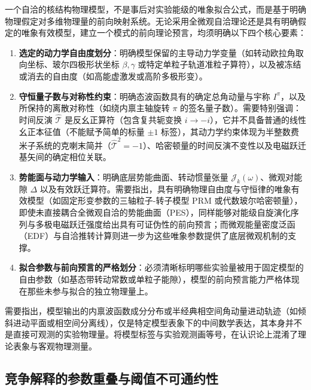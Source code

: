 一个自洽的核结构物理模型，不是事后对实验能级的唯象拟合公式，而是基于明确物理假定对多维物理量的前向映射系统。无论采用全微观自洽理论还是具有明确假定的唯象有效模型，建立一个模式的前向理论预言，均须明确以下四个核心要素：
\begin{enumerate}
\item \textbf{选定的动力学自由度划分}：明确模型保留的主导动力学变量（如转动欧拉角取向坐标、玻尔四极形状坐标 $\beta, \gamma$ 或特定单粒子轨道准粒子算符），以及被冻结或消去的自由度（如高能虚激发或高阶多极形变）。
\item \textbf{守恒量子数与对称性约束}：明确态波函数具有的确定总角动量与宇称 $I^\pi$，以及所保持的离散对称性（如绕内禀主轴旋转 $\pi$ 的签名量子数）。需要特别强调：时间反演 $\hat{\mathcal{T}}$ 是反幺正算符（包含复共轭变换 $i \to -i$），它并不具备普通的线性幺正本征值（不能赋予简单的标量 $\pm 1$ 标签），其动力学约束体现为半整数费米子系统的克喇末简并（$\hat{\mathcal{T}}^2 = -1$）、哈密顿量的时间反演不变性以及电磁跃迁基矢间的确定相位关联。
\item \textbf{势能面与动力学输入}：明确底层势能曲面、转动惯量张量 $\mathcal{J}_k(\omega)$、微观对能隙 $\Delta$ 以及有效跃迁算符。需要指出，具有明确物理自由度与守恒律的唯象有效模型（如固定形变参数的三轴粒子-转子模型 PRM 或代数玻尔哈密顿量），即使未直接耦合全微观自洽的势能曲面（PES），同样能够对能级自旋演化序列与多极电磁跃迁强度给出具有可证伪性的前向预言；而微观能量密度泛函（EDF）与自洽推转计算则进一步为这些唯象参数提供了底层微观机制的支撑。
\item \textbf{拟合参数与前向预言的严格划分}：必须清晰标明哪些实验量被用于固定模型的自由参数（如基态带转动常数或单粒子能隙），模型的前向预言能力严格体现在那些未参与拟合的独立物理量上。
\end{enumerate}

需要指出，模型输出的内禀波函数成分分布或半经典相空间角动量进动轨迹（如倾斜进动平面或相空间分离线），仅是特定模型表象下的中间数学表达，其本身并不是直接可观测的实验物理量。将模型标签与实验观测画等号，在认识论上混淆了理论表象与客观物理测量。

\subsection{竞争解释的参数重叠与阈值不可通约性}\label{sec:3-8-2}

